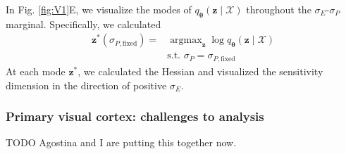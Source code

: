 \documentclass[11pt]{article}
\DeclareMathOperator*{\argmax}{argmax}
\begin{document}
In Fig. \ref{fig:V1}E, we visualize the modes of $q_{\bm{\theta}}(\mathbf{z} \mid \mathcal{X})$ throughout the $\sigma_E$-$\sigma_P$ marginal.
Specifically, we calculated
\begin{equation}
\begin{split}
\mathbf{z}^*(\sigma_{P,\text{fixed}}) = &\argmax_{\mathbf{z}} \log q_{\bm{\theta}}(\mathbf{z} \mid \mathcal{X}) \\
&\text{s.t. } \sigma_P = \sigma_{P,\text{fixed}}\
\end{split}
\end{equation}
At each mode $\mathbf{z}^*$, we calculated the Hessian and visualized the sensitivity dimension in the direction of positive $\sigma_E$.



\subsubsection{Primary visual cortex: challenges to analysis}\label{methods_V1_complexity}
TODO Agostina and I are putting this together now.
\end{document}
